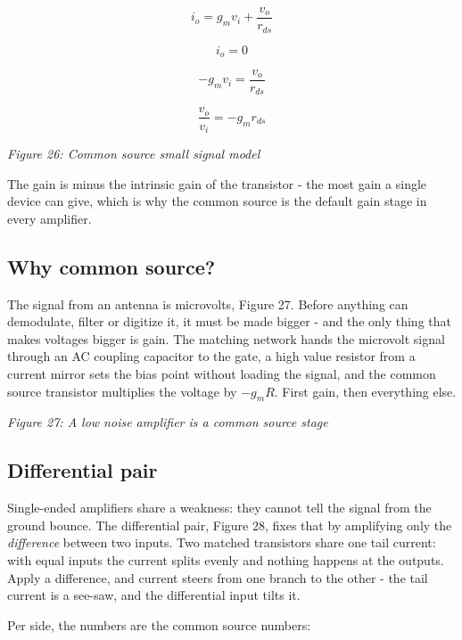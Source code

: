 \[ i_{o} = g_m v_i + \frac{v_o}{r_{ds}} \]

\[ i_o = 0 \]

\[ -g_m v_i = \frac{v_o}{r_{ds}} \]

\[ \frac{v_o}{v_i} = - g_m r_{ds}\]


{
\centering
{}
}

\emph{Figure 26: Common source small signal model}

The gain is minus the intrinsic gain of the transistor - the most gain a
single device can give, which is why the common source is the default
gain stage in every amplifier.

\subsection{Why common source?}\label{why-common-source}

The signal from an antenna is microvolts, Figure 27. Before anything can
demodulate, filter or digitize it, it must be made bigger - and the only
thing that makes voltages bigger is gain. The matching network hands the
microvolt signal through an AC coupling capacitor to the gate, a high
value resistor from a current mirror sets the bias point without loading
the signal, and the common source transistor multiplies the voltage by
\(-g_m R\). First gain, then everything else.


{
\centering
{}
}

\emph{Figure 27: A low noise amplifier is a common source stage}

\subsection{Differential pair}\label{differential-pair}

Single-ended amplifiers share a weakness: they cannot tell the signal
from the ground bounce. The differential pair, Figure 28, fixes that by
amplifying only the \emph{difference} between two inputs. Two matched
transistors share one tail current: with equal inputs the current splits
evenly and nothing happens at the outputs. Apply a difference, and
current steers from one branch to the other - the tail current is a
see-saw, and the differential input tilts it.

Per side, the numbers are the common source numbers:


